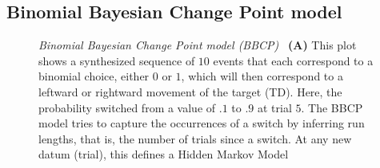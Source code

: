 \documentclass[12pt,english]{article}%
\newcommand{\seeFig}[1]{Figure~\ref{fig:#1}}
\begin{document}
\subsection{Binomial Bayesian Change Point model}
\begin{figure}%
\caption{\emph{Binomial Bayesian Change Point model (BBCP)}
~\textbf{(A)} This plot shows a synthesized sequence of $10$ events
that each correspond to a binomial choice, either $0$ or $1$,
which will then correspond to a leftward or rightward movement of the target (TD).
Here, the probability switched from a value of $.1$ to $.9$ at trial $5$.
The BBCP model tries to capture the occurrences of a switch by inferring run lengths,
that is, the number of trials since a switch.
At any new datum (trial), this defines a Hidden Markov Model
}
\end{figure}
\end{document}
